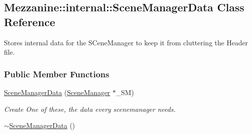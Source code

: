 \hypertarget{classMezzanine_1_1internal_1_1SceneManagerData}{
\subsection{Mezzanine::internal::SceneManagerData Class Reference}
\label{classMezzanine_1_1internal_1_1SceneManagerData}
}


Stores internal data for the SCeneManager to keep it from cluttering the Header file.  


\subsubsection*{Public Member Functions}
\begin{DoxyCompactItemize}
\item 
\hyperlink{classMezzanine_1_1internal_1_1SceneManagerData_ad3efec82c76c38ef90cd8f2fb86a7e60}{SceneManagerData} (\hyperlink{classMezzanine_1_1SceneManager}{SceneManager} $\ast$\_\-SM)
\begin{DoxyCompactList}\small\item\em Create One of these, the data every scenemanager needs. \item\end{DoxyCompactList}\item 
\hypertarget{classMezzanine_1_1internal_1_1SceneManagerData_a0ed3e209d22dd68db12aa9b4d736a5b5}{
\hyperlink{classMezzanine_1_1internal_1_1SceneManagerData_a0ed3e209d22dd68db12aa9b4d736a5b5}{$\sim$SceneManagerData} ()}
\label{classMezzanine_1_1internal_1_1SceneManagerData_a0ed3e209d22dd68db12aa9b4d736a5b5}


\end{DoxyCompactItemize}

